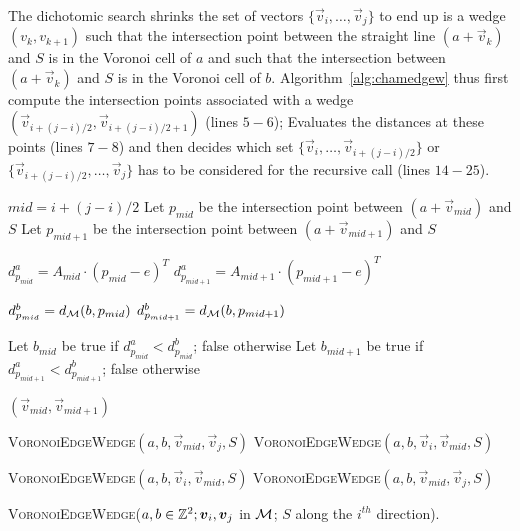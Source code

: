 \documentclass{llncs}
\begin{document}
The dichotomic search shrinks the set of vectors
$\{\vec{v}_i,\ldots,\vec{v}_j\}$ to end up is a wedge $(v_k,v_{k+1})$
such that the intersection point between the straight line $(a +
\vec{v}_k)$ and $S$ is in the Voronoi cell of $a$ and such that the
intersection between $(a + \vec{v}_k)$ and $S$ is in the Voronoi cell
of $b$. Algorithm~\ref{alg:chamedgew} thus first compute the
intersection points associated with a wedge $(\vec{v}_{i+(j-i)/2},
\vec{v}_{i+(j-i)/2+1})$ (lines $5-6$); Evaluates the distances at
these points (lines $7-8$) and then decides which set
$\{\vec{v}_i,\ldots,\vec{v}_{i+(j-i)/2}\}$ or
$\{\vec{v}_{i+(j-i)/2},\ldots,\vec{v}_j\}$ has to be considered for
the recursive call (lines $14-25$).

\begin{algorithm}
\small
{
   $mid  = i + (j-i)/2$\;
   Let $p_{mid}$  be the intersection point between $(a +
   \vec{v}_{mid})$ and $S$\;
  Let $p_{mid+1}$  be the intersection point between $(a +
   \vec{v}_{mid+1})$ and $S$\;


   $d^a_{p_{mid}} = A_{mid}\cdot (p_{mid}-e)^T$\;
   $d^a_{p_{mid+1}} = A_{mid+1}\cdot (p_{mid+1}-e)^T$\;


   $d^b_{p_{mid}} = d_{\mathcal{M}}(b, p_{mid})$\;
   $d^b_{p_{mid+1}} = d_{\mathcal{M}}(b,p_{mid+1})$\;

   Let $b_{mid}$ be true if $d^a_{p_{mid}} < d^b_{p_{mid}}$; false otherwise\;
   Let $b_{mid+1}$ be true if $d^a_{p_{mid+1}} < d^b_{p_{mid+1}}$; false otherwise\;


    { \Return $(\vec{v}_{mid},\vec{v}_{mid+1})$\; }

{
{
  \Return \textsc{VoronoiEdgeWedge}$(a,b,\vec{v}_{mid}, \vec{v}_{j}, S)$\;
}
{
  \Return \textsc{VoronoiEdgeWedge}$(a,b,\vec{v}_{i}, \vec{v}_{mid}, S)$\;
}

}
{
{
  \Return \textsc{VoronoiEdgeWedge}$(a,b,\vec{v}_{i}, \vec{v}_{mid}, S)$\;
}
{
  \Return \textsc{VoronoiEdgeWedge}$(a,b,\vec{v}_{mid}, \vec{v}_{j}, S)$\;
}

}

}
  \caption{\textsc{VoronoiEdgeWedge}($a,b\in\Z^2; \vec{v}_i,\vec{v}_j$
    in $\mathcal{M}$; $S$ along the $i^{th}$ direction).\label{alg:chamedgew}}
\end{algorithm}
\end{document}
